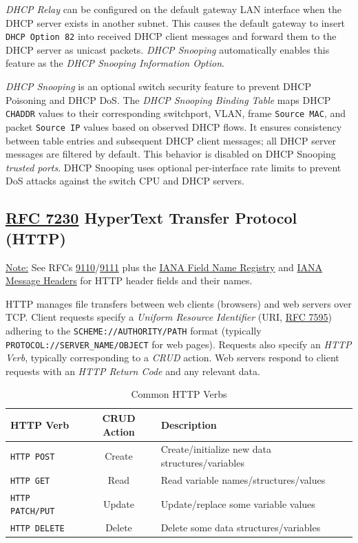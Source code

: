 \documentclass[12pt]{article}
\newif\ifcolor											%
\newcommand{\note}[1]{\ifcolor \colorbox{#1}{Note:}\else \underline{Note:}\fi}
\newcommand{\rfc}[1]{\href{https://datatracker.ietf.org/doc/html/rfc#1}{#1}}
\newcommand{\RFC}[1]{\href{https://datatracker.ietf.org/doc/html/rfc#1}{RFC #1}}
\begin{document}
	\textit{DHCP Relay} can be configured on the default gateway LAN interface when the DHCP server exists in another subnet. This causes the default gateway to insert \texttt{DHCP Option 82} into received DHCP client messages and forward them to the DHCP server as unicast packets. \textit{DHCP Snooping} automatically enables this feature as the \textit{DHCP Snooping Information Option}.

	\textit{DHCP Snooping} is an optional switch security feature to prevent DHCP Poisoning and DHCP DoS. The \textit{DHCP Snooping Binding Table} maps DHCP \texttt{CHADDR} values to their corresponding switchport, VLAN, frame \texttt{Source MAC}, and packet \texttt{Source IP} values based on observed DHCP flows. It ensures consistency between table entries and subsequent DHCP client messages; all DHCP server messages are filtered by default. This behavior is disabled on DHCP Snooping \textit{trusted ports}. DHCP Snooping uses optional per-interface rate limits to prevent DoS attacks against the switch CPU and DHCP servers.


	\subsection[RFC 7230 HTTP]{\RFC{7230} HyperText Transfer Protocol (HTTP) \label{subsec:HTTP}}
	\note{Goldenrod} See RFCs \rfc{9110}/\rfc{9111} plus the \href{https://www.iana.org/assignments/http-fields/http-fields.xhtml#field-names}{IANA Field Name Registry} and \href{https://www.iana.org/assignments/message-headers/message-headers.xml#perm-headers}{IANA Message Headers} for HTTP header fields and their names.

	HTTP manages file transfers between web clients (browsers) and web servers over TCP. Client requests specify a \textit{Uniform Resource Identifier} (URI, \RFC{7595}) adhering to the \texttt{SCHEME://AUTHORITY/PATH} format (typically \texttt{PROTOCOL://SERVER\_NAME/OBJECT} for web pages). Requests also specify an \textit{HTTP Verb}, typically corresponding to a \textit{CRUD} action. Web servers respond to client requests with an \textit{HTTP Return Code} and any relevant data.

	\begin{table}[H]
	\centering
	\caption{Common HTTP Verbs \label{tab:HTTP VERBS}}
	\begin{tabular}{@{} l c l @{}}\hline
	\textbf{HTTP Verb}		& \textbf{CRUD Action}	& \textbf{Description}\\\hline
	\texttt{HTTP POST}		& Create			& Create/initialize new data structures/variables\\
	\texttt{HTTP GET}			& Read			& Read variable names/structures/values\\
	\texttt{HTTP PATCH/PUT}	& Update			& Update/replace some variable values\\
	\texttt{HTTP DELETE}		& Delete			& Delete some data structures/variables\\\hline
	\end{tabular}\end{table}
\end{document}
